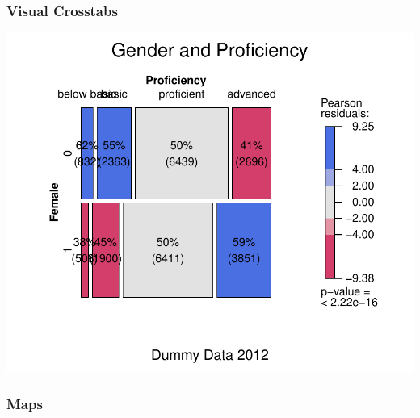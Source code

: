 \documentclass[12pt,handout]{beamer}
\begin{document}
\begin{frame}
\frametitle{Visual Crosstabs}
\vspace{.1in}
\includegraphics[width=.85\textwidth]{crosstab2}
\end{frame}

\begin{frame}
\frametitle{Maps}
\begin{center}
\end{center}
\end{frame}
\end{document}
